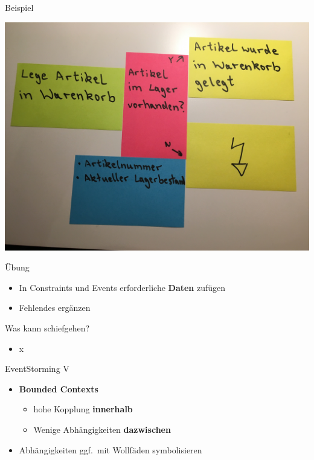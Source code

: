 \begin{frame}[fragile]{Beispiel}

\begin{center}
\includegraphics[width=.85\textwidth]{pics/eventstorming4.jpg}
\end{center}

\end{frame}


\begin{frame}[fragile]{Übung}

\begin{itemize}
\item In Constraints und Events erforderliche \textbf{Daten} zufügen
\item Fehlendes ergänzen
\end{itemize}

\end{frame}


\begin{frame}[fragile]{Was kann schiefgehen?}

\begin{itemize}
\item x
\end{itemize}

\end{frame}


\begin{frame}[fragile]{EventStorming V}

\begin{itemize}
\item \textbf{Bounded Contexts}
\begin{itemize}
\item hohe Kopplung \textbf{innerhalb}
\item Wenige Abhängigkeiten \textbf{dazwischen}
\end{itemize}
\item Abhängigkeiten ggf.~mit Wollfäden symbolisieren
\end{itemize}

\end{frame}

